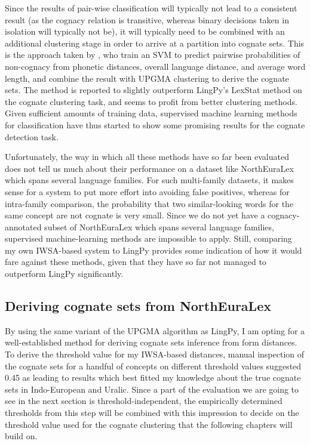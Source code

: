 Since the results of pair-wise classification will typically not lead to a consistent result (as the cognacy relation is transitive, whereas binary decisions taken in isolation will typically not be), it will typically need to be combined with an additional clustering stage in order to arrive at a partition into cognate sets. This is the approach taken by \cite{jaeger_sofroniev_2016}, who train an SVM to predict pairwise probabilities of non-cognacy from phonetic distances, overall language distance, and average word length, and combine the result with UPGMA clustering to derive the cognate sets. The method is reported to slightly outperform LingPy's LexStat method on the cognate clustering task, and seems to profit from better clustering methods. Given sufficient amounts of training data, supervised machine learning methods for classification have thus started to show some promising results for the cognate detection task.

Unfortunately, the way in which all these methods have so far been evaluated does not tell us much about their performance on a dataset like NorthEuraLex which spans several language families. For such multi-family datasets, it makes sense for a system to put more effort into avoiding false positives, whereas for intra-family comparison, the probability that two similar-looking words for the same concept are not cognate is very small. Since we do not yet have a cognacy-annotated subset of NorthEuraLex which spans several language families, supervised machine-learning methods are impossible to apply. Still, comparing my own IWSA-based system to LingPy provides some indication of how it would fare against these methods, given that they have so far not managed to outperform LingPy significantly.

\subsection{Deriving cognate sets from NorthEuraLex}
By using the same variant of the UPGMA algorithm as LingPy, I am opting for a well-established method for deriving cognate sets inference from form distances. To derive the threshold value for my IWSA-based distances, manual inspection of the cognate sets for a handful of concepts on different threshold values suggested 0.45 as leading to results which best fitted my knowledge about the true cognate sets in Indo-European and Uralic. Since a part of the evaluation we are going to see in the next section is threshold-independent, the empirically determined thresholds from this step will be combined with this impression to decide on the threshold value used for the cognate clustering that the following chapters will build on.

